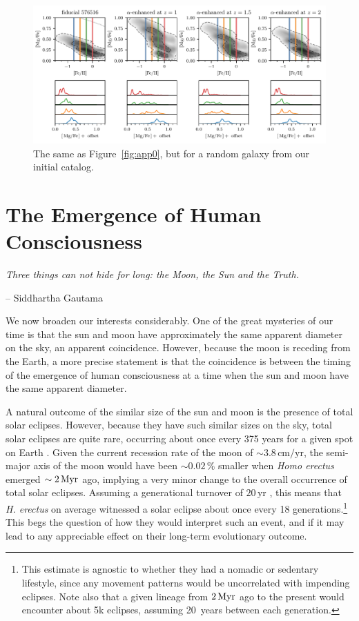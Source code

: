 \begin{appendices}
\begin{figure}
  \centering
  \includegraphics[width=\textwidth]{ch4/app_576516.pdf}
  \caption{The same as Figure~\ref{fig:app0}, but for a random galaxy from our initial catalog.}
  \label{fig:app16}
\end{figure}

\chapter{The Emergence of Human Consciousness}
\begin{adjustwidth}{.8cm}{0cm}
\textit{Three things can not hide for long: the Moon, the Sun and the Truth.}

\hspace{9cm} -- Siddhartha Gautama
\end{adjustwidth}

\noindent
We now broaden our interests considerably. One of the great mysteries of our time is that the sun and moon have approximately the same apparent diameter on the sky, an apparent coincidence. However, because the moon is receding from the Earth, a more precise statement is that the coincidence is between the timing of the emergence of human consciousness at a time when the sun and moon have the same apparent diameter.

A natural outcome of the similar size of the sun and moon is the presence of total solar eclipses. However, because they have such similar sizes on the sky, total solar eclipses are quite rare, occurring about once every 375 years for a given spot on Earth \citep[varying somewhat with latitude][]{2002mmam.book.....M}. Given the current recession rate of the moon of $\sim3.8\,\textrm{cm}/\textrm{yr}$, the semi-major axis of the moon would have been $\sim0.02\,\%$ smaller when \textit{Homo erectus} emerged $\sim2\,\textrm{Myr}$ ago, implying a very minor change to the overall occurrence of total solar eclipses. Assuming a generational turnover of $20\,\textrm{yr}$ \citep{homoerectus_lifespan}, this means that \textit{H. erectus} on average witnessed a solar eclipse about once every 18 generations.\footnote{This estimate is agnostic to whether they had a nomadic or sedentary lifestyle, since any movement patterns would be uncorrelated with impending eclipses. Note also that a given lineage from $2\,\textrm{Myr}$ ago to the present would encounter about 5k eclipses, assuming 20~years between each generation.} This begs the question of how they would interpret such an event, and if it may lead to any appreciable effect on their long-term evolutionary outcome.


\end{appendices}
